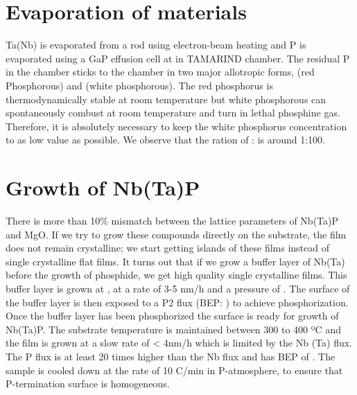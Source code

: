 \section{Evaporation of materials}

Ta(Nb) is evaporated from a rod using electron-beam heating and P is evaporated using a 
GaP effusion cell at in TAMARIND chamber. The residual P in the chamber sticks to 
the chamber in two major allotropic forms, \ptwo (red Phosphorous) and \pfour (white 
phosphorous). The red phosphorus is thermodynamically stable at room temperature but 
white phosphorous can spontaneously combust at room temperature and turn in lethal phosphine 
\phosphine gas. Therefore, it is absolutely necessary to keep the white phosphorus
concentration to as low value as possible. We observe that the ration of 
\ptwo : \pfour is around 1:100.

\section{Growth of Nb(Ta)P}


There is more than 10\% mismatch between the lattice parameters of Nb(Ta)P and MgO.
If we try to grow these compounds directly on the substrate, the film does not remain 
crystalline; we start getting islands of these films instead of single crystalline flat 
films.  It turns out that if we grow a buffer layer of Nb(Ta) before the growth of 
phosphide, we get high quality single crystalline films. This buffer layer is grown at 
, at a rate of 3-5 nm/h and a pressure of . The surface 
of the buffer layer is then exposed to a P2 flux (BEP: ) to achieve phosphorization.
Once the buffer layer has been phosphorized the surface is ready for growth of Nb(Ta)P. 
The substrate temperature is maintained between 300 to 400 ºC and the film is grown at a 
slow rate of < 4nm/h which is limited by the Nb (Ta) flux. The P flux is at least 20 times 
higher than the Nb flux and has BEP of . The sample is cooled down at the rate of 
10 \degree C/min in P-atmosphere, to ensure that P-termination surface is homogeneous. 


